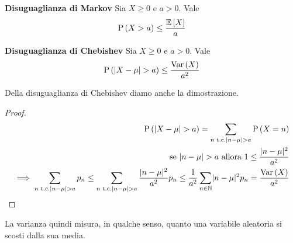 \begin{prop}
    \textbf{Disuguaglianza di Markov}
	Sia $X \geq 0$ e $ a > 0$. Vale
    \begin{equation}
        \text{P}\left(X > a\right) \le \dfrac{\mathbb{E}\left[X\right]}{a}
    \end{equation}
\end{prop}

\begin{prop}
	\textbf{Disuguaglianza di Chebishev}
	Sia $X \geq 0$ e $ a > 0$. Vale
	\begin{equation}
					\text{P}\left(\lvert X - \mu\rvert > a\right) \leq \dfrac{\text{Var}\left(X\right)}{a^2}
	\end{equation}
\end{prop}
Della disuguaglianza di Chebishev diamo anche la dimostrazione.
\begin{proof}
    \begin{equation*}
        \begin{aligned}
            \text{P}\left(\lvert X - \mu\rvert > a\right) = \sum_{n \text{ t.c.} \lvert n - \mu\rvert > a} \text{P}\left(X = n\right) \\				\text{se } \lvert n - \mu\rvert > a \text{ allora } 1 \le \dfrac{\lvert n - \mu\rvert^2}{a^2} \\
            \implies  \sum_{n \text{ t.c.} \lvert n - \mu\rvert > a}  p_n
                \leq \sum_{n \text{ t.c.} \lvert n - \mu\rvert > a}  \dfrac{\lvert n - \mu\rvert^2}{a^2} p_n \leq \dfrac{1}{a^2} \sum_{n\in \mathbb{N}} \lvert n - \mu\rvert^2 p_n =\dfrac{\text{Var}\left(X\right)}{a^2}
        \end{aligned}
    \end{equation*}
\end{proof}

La varianza quindi misura, in qualche senso, quanto una variabile aleatoria si scosti dalla sua media.

